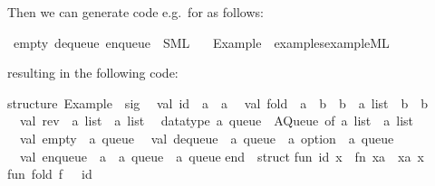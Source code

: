 \begin{isabellebody}
\endisatagquote
{\isafoldquote}%
%
\isadelimquote
%
\endisadelimquote
%
\isadeliminvisible
%
\endisadeliminvisible
%
\isataginvisible
%
\endisataginvisible
{\isafoldinvisible}%
%
\isadeliminvisible
%
\endisadeliminvisible
%
\begin{isamarkuptext}%
\noindent Then we can generate code e.g.~for  as follows:%
\end{isamarkuptext}%
\isamarkuptrue%
%
\isadelimquote
%
\endisadelimquote
%
\isatagquote
{}\isamarkupfalse%
\ empty\ dequeue\ enqueue\ \ SML\isanewline
\ \ \ Example\ \ {\isachardoublequoteopen}examples{\isacharslash}example{\isachardot}ML{\isachardoublequoteclose}%
\endisatagquote
{\isafoldquote}%
%
\isadelimquote
%
\endisadelimquote
%
\begin{isamarkuptext}%
\noindent resulting in the following code:%
\end{isamarkuptext}%
\isamarkuptrue%
%
\isadelimtypewriter
%
\endisadelimtypewriter
%
\isatagtypewriter
%
\begin{isamarkuptext}%
structure\ Example\ {\isacharcolon}\ sig\isanewline
\ \ val\ id\ {\isacharcolon}\ {\isacharprime}a\ {\isacharminus}{\isachargreater}\ {\isacharprime}a\isanewline
\ \ val\ fold\ {\isacharcolon}\ {\isacharparenleft}{\isacharprime}a\ {\isacharminus}{\isachargreater}\ {\isacharprime}b\ {\isacharminus}{\isachargreater}\ {\isacharprime}b{\isacharparenright}\ {\isacharminus}{\isachargreater}\ {\isacharprime}a\ list\ {\isacharminus}{\isachargreater}\ {\isacharprime}b\ {\isacharminus}{\isachargreater}\ {\isacharprime}b\isanewline
\ \ val\ rev\ {\isacharcolon}\ {\isacharprime}a\ list\ {\isacharminus}{\isachargreater}\ {\isacharprime}a\ list\isanewline
\ \ datatype\ {\isacharprime}a\ queue\ {\isacharequal}\ AQueue\ of\ {\isacharprime}a\ list\ {\isacharasterisk}\ {\isacharprime}a\ list\isanewline
\ \ val\ empty\ {\isacharcolon}\ {\isacharprime}a\ queue\isanewline
\ \ val\ dequeue\ {\isacharcolon}\ {\isacharprime}a\ queue\ {\isacharminus}{\isachargreater}\ {\isacharprime}a\ option\ {\isacharasterisk}\ {\isacharprime}a\ queue\isanewline
\ \ val\ enqueue\ {\isacharcolon}\ {\isacharprime}a\ {\isacharminus}{\isachargreater}\ {\isacharprime}a\ queue\ {\isacharminus}{\isachargreater}\ {\isacharprime}a\ queue\isanewline
end\ {\isacharequal}\ struct\isanewline
\isanewline
fun\ id\ x\ {\isacharequal}\ {\isacharparenleft}fn\ xa\ {\isacharequal}{\isachargreater}\ xa{\isacharparenright}\ x{\isacharsemicolon}\isanewline
\isanewline
fun\ fold\ f\ {\isacharbrackleft}{\isacharbrackright}\ {\isacharequal}\ id\isanewline

\end{isamarkuptext}
\end{isabellebody}
